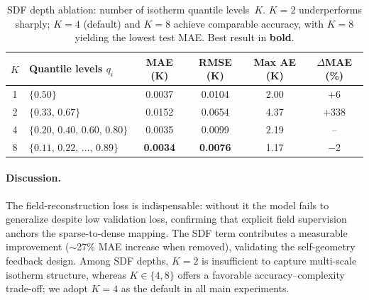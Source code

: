 \begin{table}[t]
  \centering
  \caption{SDF depth ablation: number of isotherm quantile levels~$K$.
    $K{=}2$ underperforms sharply; $K{=}4$ (default) and $K{=}8$ achieve
    comparable accuracy, with $K{=}8$ yielding the lowest test MAE.
    Best result in \textbf{bold}.}
  \label{tab:ablation_k}
  \begin{tabular}{c l S[table-format=1.4] S[table-format=1.4] S[table-format=2.2] c}
    \toprule
    {$K$} & {Quantile levels $q_i$} & {MAE (K)} & {RMSE (K)} & {Max AE (K)} & {$\Delta$MAE (\%)} \\
     & $\{0.50\}$                                                       & 0.0037 & 0.0104 & 2.00 & +6  \\
    2 & $\{0.33,\,0.67\}$                                                & 0.0152 & 0.0654 & 4.37 & +338 \\
    4 & $\{0.20,\,0.40,\,0.60,\,0.80\}$                                  & 0.0035 & 0.0099 & 2.19 & {--} \\
    8 & $\{0.11,\,0.22,\,\ldots,\,0.89\}$                                 & \bfseries 0.0034 & \bfseries 0.0076 & 1.17 & $-$2 \\
    \bottomrule
  \end{tabular}
\end{table}

\paragraph{Discussion.}
The field-reconstruction loss is indispensable: without it the model fails to
generalize despite low validation loss, confirming that explicit field
supervision anchors the sparse-to-dense mapping.
The SDF term contributes a measurable improvement ($\sim$27\% MAE increase
when removed), validating the self-geometry feedback design.
Among SDF depths, $K{=}2$ is insufficient to capture multi-scale isotherm
structure, whereas $K{\in}\{4,8\}$ offers a favorable accuracy--complexity
trade-off; we adopt $K{=}4$ as the default in all main experiments.

%
%
